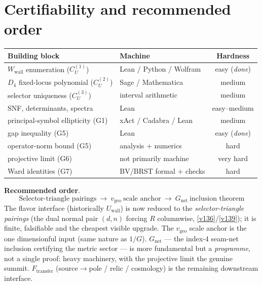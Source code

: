 \section*{Certifiability and recommended order}
\begin{center}\footnotesize
\renewcommand{\arraystretch}{1.2}
\begin{tabularx}{\linewidth}{@{}Ylc@{}}
\toprule
\textbf{Building block} & \textbf{Machine} & \textbf{Hardness} \\
\midrule
$W_{\mathrm{wall}}$ enumeration ($C_U^{(1)}$) & Lean / Python / Wolfram & easy (\emph{done}) \\
$D_4$ fixed-locus polynomial ($C_U^{(2)}$) & Sage / Mathematica & medium \\
selector uniqueness ($C_U^{(3)}$) & interval arithmetic & medium \\
SNF, determinants, spectra & Lean & easy--medium \\
principal-symbol ellipticity (G1) & xAct / Cadabra / Lean & medium \\
gap inequality (G5) & Lean & easy (\emph{done}) \\
operator-norm bound (G5) & analysis $+$ numerics & hard \\
projective limit (G6) & not primarily machine & very hard \\
Ward identities (G7) & BV/BRST formal $+$ checks & hard \\
\bottomrule
\end{tabularx}
\end{center}

\par\smallskip\noindent\textbf{Recommended order}.
\[
  \boxed{\ \text{Selector-triangle pairings}\ \rightarrow\ v_{\mathrm{geo}}\ \text{scale anchor}\ \rightarrow\ G_{\mathrm{net}}\ \text{inclusion theorem}\ }
\]
The flavor interface (historically $U_{\mathrm{wall}}$) is now reduced to the \emph{selector-triangle
pairings} (the dual normal pair $(d,n)$ forcing $R$ columnwise, \vref{v136}/\vref{v139}); it is finite,
falsifiable and the cheapest visible upgrade. The $v_{\mathrm{geo}}$ scale anchor is the one dimensionful
input (same nature as $1/G$). $G_{\mathrm{net}}$ --- the index-4 seam-net inclusion certifying the metric
sector --- is more fundamental but a \emph{programme}, not a single proof: heavy machinery, with the
projective limit the genuine summit. $F_{\mathrm{transfer}}$ (source$\to$pole / relic / cosmology) is the
remaining downstream interface.

